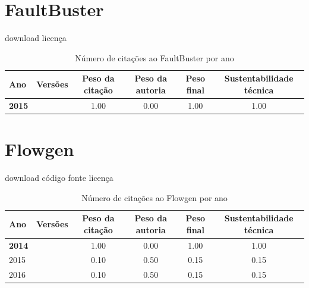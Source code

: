 \section{FaultBuster}
\checkmark download
\checkmark licença


\begin{table}[H]
\caption{Número de citações ao FaultBuster por ano}
\centering
\begin{tabular}{| l | c | c | c | c | c |}
  \hline
  Ano & Versões & Peso da citação & Peso da autoria & Peso final & Sustentabilidade técnica \\
  \hline
            {\bf 2015}
          &
          
          &
          1.00
          &
          0.00
          &
          1.00
          &
            {\color{blue} 1.00}
          \\
\hline
\end{tabular}
\end{table}



\section{Flowgen}
\checkmark download
\checkmark código fonte
\checkmark licença


\begin{table}[H]
\caption{Número de citações ao Flowgen por ano}
\centering
\begin{tabular}{| l | c | c | c | c | c |}
  \hline
  Ano & Versões & Peso da citação & Peso da autoria & Peso final & Sustentabilidade técnica \\
  \hline
            {\bf 2014}
          &
          
          &
          1.00
          &
          0.00
          &
          1.00
          &
            {\color{blue} 1.00}
          \\
\hline
            2015
          &
          
          &
          0.10
          &
          0.50
          &
          0.15
          &
            {\color{red} 0.15}
          \\
\hline
            2016
          &
          
          &
          0.10
          &
          0.50
          &
          0.15
          &
            {\color{red} 0.15}
          \\
\hline
\end{tabular}
\end{table}



